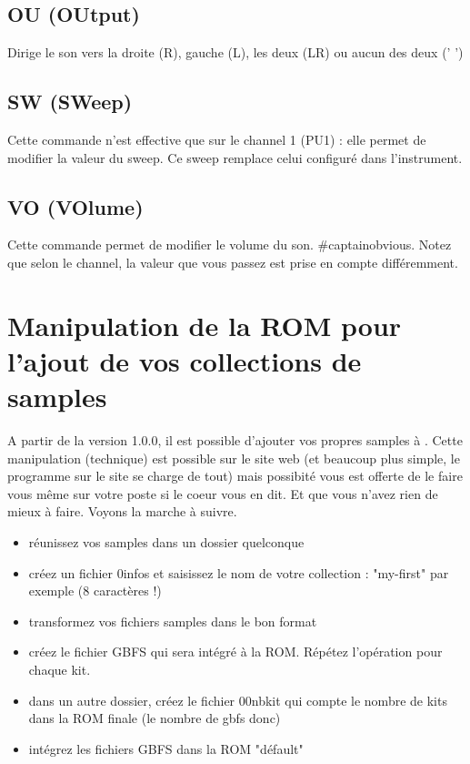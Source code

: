 \documentclass[12pt,a4paper]{article}
\begin{document}
    \subsection{OU (OUtput)}

    Dirige le son vers la droite (R), gauche (L), les deux (LR) ou aucun des deux ('  ')

    \subsection{SW (SWeep)}

    Cette commande n'est effective que sur le channel 1 (PU1) : elle permet de modifier la valeur du sweep.
    Ce sweep remplace celui configuré dans l'instrument.

    \subsection{VO (VOlume)}

    Cette commande permet de modifier le volume du son.
    \#captainobvious.
    Notez que selon le channel, la valeur que vous passez est prise en compte différemment.

    \newpage
    \section{Manipulation de la ROM pour l'ajout de vos collections de samples}

    A partir de la version 1.0.0, il est possible d'ajouter vos propres samples à \FAT.
    Cette manipulation (technique) est possible sur le site web (et beaucoup plus simple, le programme sur le site se charge de tout)
    mais possibité vous est offerte de le faire vous même sur votre poste si le coeur vous en dit. Et que vous n'avez rien de mieux à faire.
    Voyons la marche à suivre.
    \medskip

    \begin{itemize}
      \item{réunissez vos samples dans un dossier quelconque}
      \item{créez un fichier 0infos et saisissez le nom de votre collection : "my-first" par exemple (8 caractères !) }
      \item{transformez vos fichiers samples dans le bon format}
      \item{créez le fichier GBFS qui sera intégré à la ROM. Répétez l'opération pour chaque kit.}
      \item{dans un autre dossier, créez le fichier 00nbkit qui compte le nombre de kits dans la ROM finale (le nombre de gbfs donc)}
      \item{intégrez les fichiers GBFS dans la ROM "défault"}
    \end{itemize}\medskip
\end{document}
